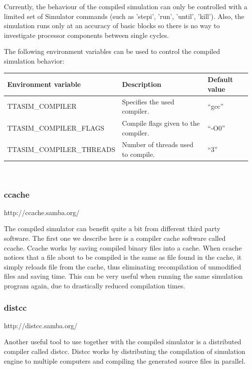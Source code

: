 \documentclass[twoside]{tceusermanual}
\begin{document}
Currently, the behaviour of the compiled simulation can only be controlled with
a limited set of Simulator commands (such as 'stepi', 'run', 'until', 'kill').
Also, the simulation runs only at an accuracy of basic blocks so there 
is no way to investigate processor components between single cycles.

The following environment variables can be used to control the compiled
simulation behavior: \\

\begin{tabular}{p{}p{}
                p{}}
\textbf{Environment variable} &\textbf{Description} &\textbf{Default value} \\
\hline
TTASIM\_COMPILER & Specifies the used compiler. & ``gcc'' \\
TTASIM\_COMPILER\_FLAGS & Compile flags given to the compiler. & ``-O0'' \\
TTASIM\_COMPILER\_THREADS & Number of threads used to compile. & ``3'' \\

\end{tabular}\\


\subsubsection{ccache}
http://ccache.samba.org/

The compiled simulator can benefit quite a bit from different third party
software. The first one we describe here is a compiler cache software called
ccache. Ccache works by saving compiled binary files into a cache. When ccache
notices that a file about to be compiled is the same as file found in the
cache, it simply reloads file from the cache, thus eliminating recompilation
of unmodified files and saving time. This can be very useful when running the
same simulation program again, due to drastically reduced compilation times.

\subsubsection{distcc}
http://distcc.samba.org/

Another useful tool to use together with the compiled simulator is a
distributed compiler called distcc. Distcc works by distributing the 
compilation of simulation engine to multiple computers and compiling 
the generated source files in parallel.
\end{document}

